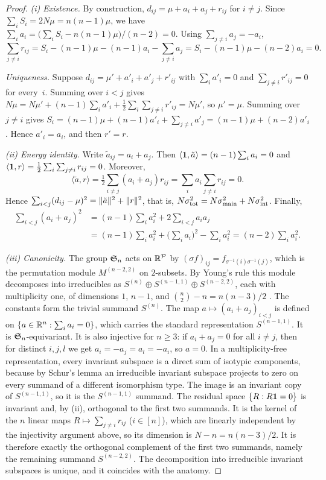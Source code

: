 \begin{proof}
\emph{(i) Existence.} By construction, $d_{ij}=\mu+a_i+a_j+r_{ij}$ for $i\neq j$.
Since $\sum_iS_i=2N\mu=n(n-1)\mu$, we have
$\sum_i a_i=\big(\sum_iS_i-n(n-1)\mu\big)/(n-2)=0$. Using $\sum_{j\neq i}a_j=-a_i$,
\[
\sum_{j\neq i}r_{ij}
=S_i-(n-1)\mu-(n-1)a_i-\sum_{j\neq i}a_j
=S_i-(n-1)\mu-(n-2)a_i=0 .
\]

\emph{Uniqueness.} Suppose $d_{ij}=\mu'+a'_i+a'_j+r'_{ij}$ with $\sum_ia'_i=0$ and
$\sum_{j\ne i}r'_{ij}=0$ for every~$i$. Summing over $i<j$ gives
$N\mu=N\mu'+(n-1)\sum_ia'_i+\tfrac12\sum_i\sum_{j\neq i}r'_{ij}=N\mu'$, so $\mu'=\mu$.
Summing over $j\neq i$ gives
$S_i=(n-1)\mu+(n-1)a'_i+\sum_{j\neq i}a'_j=(n-1)\mu+(n-2)a'_i$. Hence $a'_i=a_i$,
and then $r'=r$.

\emph{(ii) Energy identity.} Write $\tilde a_{ij}=a_i+a_j$. Then
$\langle\mathbf{1},\tilde a\rangle=(n-1)\sum_ia_i=0$ and
$\langle\mathbf{1},r\rangle=\tfrac12\sum_i\sum_{j\neq i}r_{ij}=0$. Moreover,
\[
\langle\tilde a,r\rangle=\tfrac12\sum_{i\neq j}(a_i+a_j)r_{ij}
=\sum_i a_i\sum_{j\neq i}r_{ij}=0 .
\]
Hence $\sum_{i<j}(d_{ij}-\mu)^2=\lVert\tilde a\rVert^2+\lVert r\rVert^2$, that is,
$N\sigma^2_{\mathrm{tot}}=N\sigma^2_{\mathrm{main}}+N\sigma^2_{\mathrm{int}}$. Finally,
\begin{align*}
\sum_{i<j}(a_i+a_j)^2&=(n-1)\sum_ia_i^2+2\sum_{i<j}a_ia_j\\
&=(n-1)\sum_ia_i^2+\Big(\sum_ia_i\Big)^2-\sum_ia_i^2=(n-2)\sum_ia_i^2 .
\end{align*}

\emph{(iii) Canonicity.} The group $\mathfrak{S}_n$ acts on $\mathbb{R}^{\mathcal{P}}$ by
$(\sigma f)_{ij}=f_{\sigma^{-1}(i)\sigma^{-1}(j)}$, which is the permutation module
$M^{(n-2,2)}$ on $2$-subsets. By Young's rule this module decomposes into irreducibles as
$S^{(n)}\oplus S^{(n-1,1)}\oplus S^{(n-2,2)}$, each with multiplicity one, of
dimensions $1$, $n-1$, and $\binom n2-n=n(n-3)/2$
\citep{james1978representation,diaconis1988group}. The constants form the trivial
summand $S^{(n)}$. The map $a\mapsto(a_i+a_j)_{i<j}$ is defined on
$\{a\in\mathbb{R}^n:\sum_ia_i=0\}$, which carries the standard representation
$S^{(n-1,1)}$. It is $\mathfrak{S}_n$-equivariant. It is also injective for $n\ge3$: if
$a_i+a_j=0$ for all $i\ne j$, then for distinct $i,j,l$ we get $a_i=-a_j=a_l=-a_i$,
so $a=0$. In a multiplicity-free representation, every invariant subspace is a
direct sum of isotypic components, because by Schur's lemma an irreducible
invariant subspace projects to zero on every summand of a different isomorphism
type. The image is an invariant copy of $S^{(n-1,1)}$, so it is the
$S^{(n-1,1)}$ summand. The residual space $\{R:R\mathbf{1}=0\}$ is invariant and, by
(ii), orthogonal to the first two summands. It is the kernel of the $n$ linear
maps $R\mapsto\sum_{j\ne i}r_{ij}$ ($i\in[n]$), which are linearly independent by
the injectivity argument above, so its
dimension is $N-n=n(n-3)/2$. It is therefore exactly the orthogonal complement of
the first two summands, namely the remaining summand $S^{(n-2,2)}$. The
decomposition into irreducible invariant subspaces is unique, and it coincides
with the anatomy.
\end{proof}



